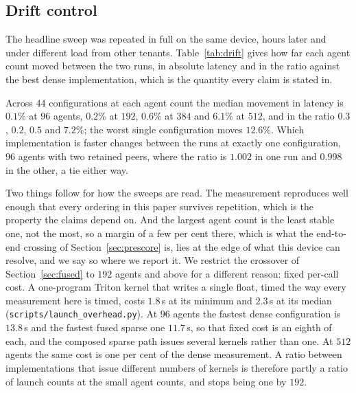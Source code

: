 \subsection{Drift control}
\label{app:drift}

The headline sweep was repeated in full on the same device, hours later and
under different load from other tenants. Table~\ref{tab:drift} gives how far
each agent count moved between the two runs, in absolute latency and in the
ratio against the best dense implementation, which is the quantity every claim
is stated in.

\begin{table}[ht]
\centering\small
\caption{Movement between two runs of the identical sweep, hours apart under
different load. Median movement is at or below one per cent everywhere except
$512$ agents, where it is six to seven per cent; no single configuration moves
by more than $12.6\%$, and no ordering the paper reports changes between the
runs.}
\label{tab:drift}

\end{table}

Across $44$ configurations at each agent count the median movement in latency is
$0.1\%$ at $96$ agents, $0.2\%$ at $192$, $0.6\%$ at $384$ and $6.1\%$ at $512$,
and in the ratio $0.3$, $0.2$, $0.5$ and $7.2\%$; the worst single configuration
moves $12.6\%$. Which implementation is faster changes between the runs at
exactly one configuration, $96$ agents with two retained peers, where the ratio
is $1.002$ in one run and $0.998$ in the other, a tie either way.

Two things follow for how the sweeps are read. The measurement reproduces well
enough that every ordering in this paper survives repetition, which is the
property the claims depend on. And the largest agent count is the least stable
one, not the most, so a margin of a few per cent there, which is what the
end-to-end crossing of Section~\ref{sec:prescore} is, lies at the edge of what
this device can resolve, and we say so where we report it. We restrict the
crossover of Section~\ref{sec:fused} to $192$ agents and above for a different
reason: fixed per-call cost. A one-program Triton kernel that writes a single
float, timed the way every measurement here is timed, costs $1.8$\,\textmu s at
its minimum and $2.3$\,\textmu s at its median
(\texttt{scripts/launch\_overhead.py}). At $96$ agents the fastest dense
configuration is $13.8$\,\textmu s and the fastest fused sparse one
$11.7$\,\textmu s, so that fixed cost is an eighth of each, and the composed
sparse path issues several kernels rather than one. At $512$ agents the same
cost is one per cent of the dense measurement. A ratio between implementations
that issue different numbers of kernels is therefore partly a ratio of launch
counts at the small agent counts, and stops being one by $192$.

